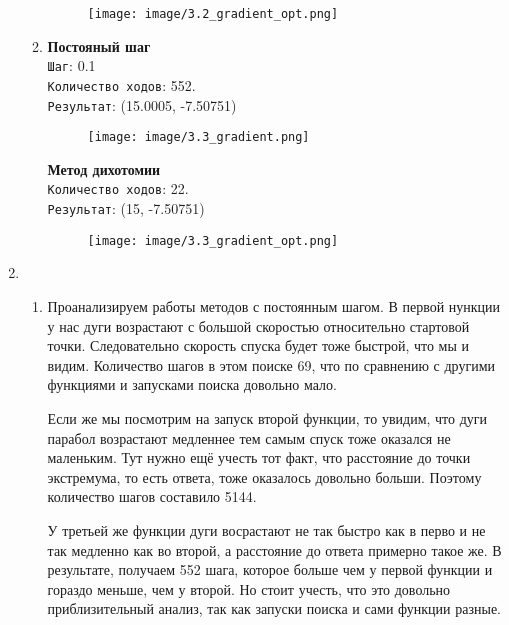 \documentclass[12pt, a4paper]{article}
\begin{document}
\begin{enumerate}
\begin{enumerate}
\begin{figure}[h]
\centering
\texttt{[image: image/3.2\_gradient\_opt.png]}
\end{figure}

    \item 

\textbf{Постояный шаг}\\
\texttt{Шаг}: 0.1\\
\texttt{Количество ходов}: 552.\\
\texttt{Результат}: (15.0005, -7.50751)

\begin{figure}[h]
\centering
\texttt{[image: image/3.3\_gradient.png]}
\end{figure}

\textbf{Метод дихотомии}\\
\texttt{Количество ходов}: 22.\\
\texttt{Результат}: (15, -7.50751)

\begin{figure}[h]
\centering
\texttt{[image: image/3.3\_gradient\_opt.png]}
\end{figure}
    
\end{enumerate}

\item

\begin{enumerate}
    \item Проанализируем работы методов с постоянным шагом. В первой нункции у нас дуги возрастают с большой скоростью относительно стартовой точки. Следовательно скорость спуска будет тоже быстрой, что мы и видим. Количество шагов в этом поиске 69, что по сравнению с другими функциями и запусками поиска довольно мало.

    Если же мы посмотрим на запуск второй функции, то увидим, что дуги парабол возрастают медленнее тем самым спуск тоже оказался не маленьким. Тут нужно ещё учесть тот факт, что расстояние до точки экстремума, то есть ответа, тоже оказалось довольно больши. Поэтому количество шагов составило 5144.

    У третьей же функции дуги восрастают не так быстро как в перво и не так медленно как во второй, а расстояние до ответа примерно такое же. В результате, получаем 552 шага, которое больше чем у первой функции и гораздо меньше, чем у второй. Но стоит учесть, что это довольно приблизительный анализ, так как запуски поиска и сами функции разные.


\end{enumerate}
\end{enumerate}
\end{document}
